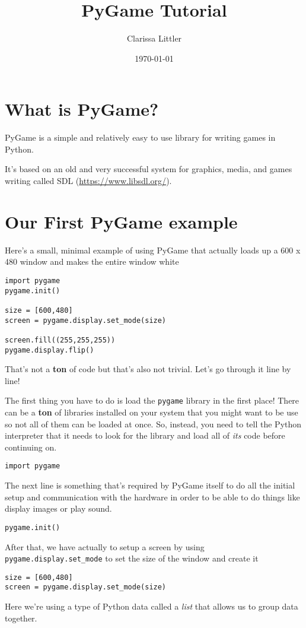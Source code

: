 \documentclass[11pt]{article}
\author{Clarissa Littler}
\date{\today}
\title{PyGame Tutorial}
\begin{document}
\maketitle
\tableofcontents


\section{What is PyGame?}
\label{sec:orga5f39c3}
PyGame is a simple and relatively easy to use library for writing games in Python.

It's based on an old and very successful system for graphics, media, and games writing called SDL (\url{https://www.libsdl.org/}).
\section{Our First PyGame example}
\label{sec:org05b4dd0}
Here's a small, minimal example of using PyGame that actually loads up a 600 x 480 window and makes the entire window white
\begin{verbatim}
import pygame
pygame.init()

size = [600,480]
screen = pygame.display.set_mode(size)

screen.fill((255,255,255))
pygame.display.flip()
\end{verbatim}

That's not a \textbf{ton} of code but that's also not trivial. Let's go through it line by line!

The first thing you have to do is load the \texttt{pygame} library in the first place! There can be a \textbf{ton} of libraries installed on your system that you might want to be use so not all of them can be loaded at once. So, instead, you need to tell the Python interpreter that it needs to look for the library and load all of \emph{its} code before continuing on. 
\begin{verbatim}
import pygame
\end{verbatim}

The next line is something that's required by PyGame itself to do all the initial setup and communication with the hardware in order to be able to do things like display images or play sound. 
\begin{verbatim}
pygame.init()
\end{verbatim}

After that, we have actually to setup a screen by using \texttt{pygame.display.set\_mode} to set the size of the window and create it 
\begin{verbatim}
size = [600,480]
screen = pygame.display.set_mode(size)
\end{verbatim}
Here we're using a type of Python data called a \emph{list} that allows us to group data together.
\end{document}
